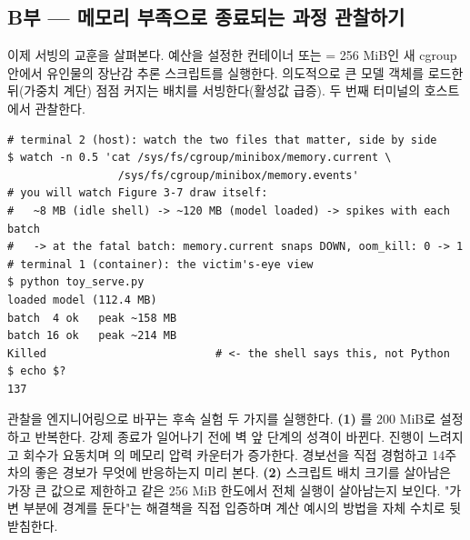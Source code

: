 \subsection*{B부 — 메모리 부족으로 종료되는 과정 관찰하기}

이제 서빙의 교훈을 살펴본다. 예산을 설정한 컨테이너 또는  = 256 MiB인 새 cgroup 안에서 유인물의 장난감 추론 스크립트를 실행한다. 의도적으로 큰 모델 객체를 로드한 뒤(가중치 계단) 점점 커지는 배치를 서빙한다(활성값 급증). 두 번째 터미널의 호스트에서 관찰한다.

\begin{terminalbox}
\begin{Verbatim}[breaklines=true,breakanywhere=true,fontsize=\small,formatcom=\color{tbbtermfg},codes=\tbbcodeactive]
# terminal 2 (host): watch the two files that matter, side by side
$ watch -n 0.5 'cat /sys/fs/cgroup/minibox/memory.current \
                 /sys/fs/cgroup/minibox/memory.events'
# you will watch Figure 3-7 draw itself:
#   ~8 MB (idle shell) -> ~120 MB (model loaded) -> spikes with each batch
#   -> at the fatal batch: memory.current snaps DOWN, oom_kill: 0 -> 1
# terminal 1 (container): the victim's-eye view
$ python toy_serve.py
loaded model (112.4 MB)
batch  4 ok   peak ~158 MB
batch 16 ok   peak ~214 MB
Killed                          # <- the shell says this, not Python
$ echo $?
137
\end{Verbatim}
\end{terminalbox}

관찰을 엔지니어링으로 바꾸는 후속 실험 두 가지를 실행한다. \textbf{(1)} 를 200 MiB로 설정하고 반복한다. 강제 종료가 일어나기 전에 벽 앞 단계의 성격이 바뀐다. 진행이 느려지고 회수가 요동치며 의 메모리 압력 카운터가 증가한다. 경보선을 직접 경험하고 14주 차의 좋은 경보가 무엇에 반응하는지 미리 본다. \textbf{(2)} 스크립트 배치 크기를 살아남은 가장 큰 값으로 제한하고 같은 256 MiB 한도에서 전체 실행이 살아남는지 보인다. "가변 부분에 경계를 둔다"는 해결책을 직접 입증하며 계산 예시의 방법을 자체 수치로 뒷받침한다.

